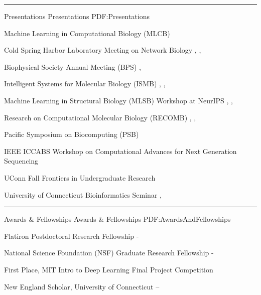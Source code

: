 \documentclass[letterpaper,MMMyyyy,nonstopmode]{simpleresumecv}
\begin{document}
\begin{Body}
\BigGap
\hrule
\Section
{Presentations}
{Presentations}
{PDF:Presentations}

\Entry
{Machine Learning in Computational Biology (MLCB)}
\hfill
{}
\Gap

\Entry
{Cold Spring Harbor Laboratory Meeting on Network Biology}
\hfill
{}, , 
\Gap

\Entry
{Biophysical Society Annual Meeting (BPS)}
\hfill
{}, 
\Gap

\Entry
{Intelligent Systems for Molecular Biology (ISMB)}
\hfill
{}, , 
\Gap

\Entry
{Machine Learning in Structural Biology (MLSB) Workshop at NeurIPS}
\hfill
{}, , 
\Gap

\Entry
{Research on Computational Molecular Biology (RECOMB)}
\hfill
{}, , 
\Gap

\Entry
{Pacific Symposium on Biocomputing (PSB)}
\hfill
{}
\Gap

\Entry
{IEEE ICCABS Workshop on Computational Advances for Next Generation Sequencing}
\hfill
{}
\Gap

\Entry
{UConn Fall Frontiers in Undergraduate Research}
\hfill
{}
\Gap

\Entry
{University of Connecticut Bioinformatics Seminar}
\hfill
{}, 

\BigGap
\hrule
\Section
{Awards \&\newline
Fellowships}
{Awards \& Fellowships}
{PDF:AwardsAndFellowships}

\Entry
{Flatiron Postdoctoral Research Fellowship}
\hfill
{} - 
\Gap

\Entry
{National Science Foundation (NSF) Graduate Research Fellowship}
\hfill
{} - 
\Gap

\Entry
{First Place, MIT Intro to Deep Learning Final Project Competition}
\hfill
{}
\Gap

\Entry
{New England Scholar, University of Connecticut}
\hfill
{} -- 
\Gap


\end{Body}
\end{document}
